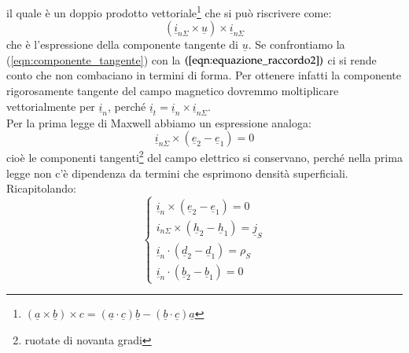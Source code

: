 \documentclass{book}
\begin{document}
        il quale è un doppio prodotto vettoriale\footnote{$(\underline{a} \times \underline{b}) \times c = (\underline{a} \cdot \underline{c}) \underline{b} - (\underline{b} \cdot \underline{c})\underline{a}$} che si può riscrivere come:
        \begin{equation}
        \label{eqn:componente_tangente}
            (\underline{i}_{n \Sigma} \times \underline{u}) \times \underline{i}_{n \Sigma}
        \end{equation}
        che è l'espressione della componente tangente di $\underline{u}$. Se confrontiamo la (\ref{eqn:componente_tangente}) con la $(\ref{eqn:equazione_raccordo2})$ ci si rende conto che non combaciano in termini di forma. Per ottenere infatti la componente rigorosamente tangente del campo magnetico dovremmo moltiplicare vettorialmente per $\underline{i}_{n}$, perché $\underline{i}_{t} = \underline{i}_{n} \times \underline{i}_{n\Sigma}$. \\
        Per la prima legge di Maxwell abbiamo un espressione analoga:
        \begin{equation}
            \underline{i}_{n \Sigma} \times (\underline{e}_{2}-\underline{e}_{1}) = 0
        \end{equation}
        cioè le componenti tangenti\footnote{ruotate di novanta gradi} del campo elettrico si conservano, perché nella prima legge non c'è dipendenza da termini che esprimono densità superficiali.\\ Ricapitolando:
        \begin{equation}
        \begin{cases}
            \underline{i}_{n} \times (\underline{e}_{2} - \underline{e}_{1}) = 0 \\
            i_{n \Sigma} \times (\underline{h}_{2}-\underline{h}_{1}) = \underline{j}_{S} \\
            \underline{i}_{n} \cdot (\underline{d}_{2} - \underline{d}_{1}) = \rho_{S} \\
            \underline{i}_{n} \cdot (\underline{b}_{2}-\underline{b}_{1}) = 0
        \end{cases}
        \end{equation}
\end{document}
